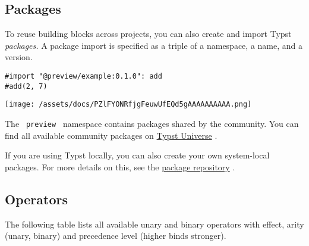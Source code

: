 \subsection{Packages}\label{packages}

To reuse building blocks across projects, you can also create and import
Typst \emph{packages.} A package import is specified as a triple of a
namespace, a name, and a version.

\begin{verbatim}
#import "@preview/example:0.1.0": add
#add(2, 7)
\end{verbatim}

\texttt{[image: /assets/docs/PZlFYONRfjgFeuwUfEQd5gAAAAAAAAAA.png]}

The \texttt{\ preview\ } namespace contains packages shared by the
community. You can find all available community packages on
\href{https://typst.app/universe/}{Typst Universe} .

If you are using Typst locally, you can also create your own
system-local packages. For more details on this, see the
\href{https://github.com/typst/packages}{package repository} .

\subsection{Operators}\label{operators}

The following table lists all available unary and binary operators with
effect, arity (unary, binary) and precedence level (higher binds
stronger).

